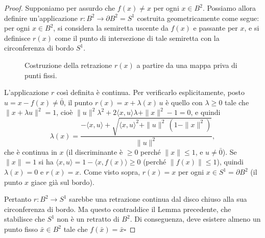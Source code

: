 \begin{proof}
Supponiamo per assurdo che $f(x) \neq x$ per ogni $x \in B^2$.
Possiamo allora definire un'applicazione $r: B^2 \to \partial B^2 = S^1$ costruita geometricamente come segue: per ogni $x \in B^2$, si considera la semiretta uscente da $f(x)$ e passante per $x$, e si definisce $r(x)$ come il punto di intersezione di tale semiretta con la circonferenza di bordo $S^1$.

\begin{figure}[H]
    \centering
    \caption{Costruzione della retrazione $r(x)$ a partire da una mappa priva di punti fissi.}
\end{figure}

L'applicazione $r$ così definita è continua. Per verificarlo esplicitamente, posto $u = x - f(x) \neq \bar{0}$, il punto $r(x) = x + \lambda(x)\,u$ \`e quello con $\lambda \geqslant 0$ tale che $\|x + \lambda u\|^2 = 1$, cio\`e $\|u\|^2\lambda^2 + 2\langle x,u\rangle \lambda + \|x\|^2 - 1 = 0$, e quindi
\[
\lambda(x) = \frac{-\langle x,u\rangle + \sqrt{\langle x,u\rangle^2 + \|u\|^2\,(1-\|x\|^2)}}{\|u\|^2},
\]
che \`e continua in $x$ (il discriminante \`e $\geqslant 0$ perch\'e $\|x\| \leqslant 1$, e $u \neq \bar 0$). Se $\|x\| = 1$ si ha $\langle x, u\rangle = 1 - \langle x, f(x)\rangle \geqslant 0$ (perch\'e $\|f(x)\| \leqslant 1$), quindi $\lambda(x) = 0$ e $r(x) = x$. Come visto sopra, $r(x) = x$ per ogni $x \in S^1 = \partial B^2$ (il punto $x$ giace gi\`a sul bordo).

Pertanto $r: B^2 \to S^1$ sarebbe una retrazione continua dal disco chiuso alla sua circonferenza di bordo. Ma questo contraddice il Lemma precedente, che stabilisce che $S^1$ non è un retratto di $B^2$.
Di conseguenza, deve esistere almeno un punto fisso $\bar{x} \in B^2$ tale che $f(\bar{x}) = \bar{x}$\hfill$\square$
\end{proof}

